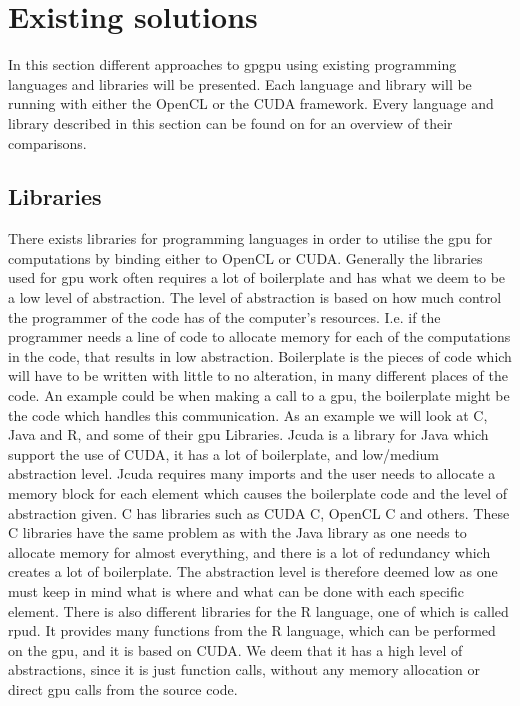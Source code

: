 \section{Existing solutions} %
\label{sec:state_of_the_art}
In this section different approaches to \acrshort{gpgpu} using existing programming languages and libraries will be presented.
Each language and library will be running with either the OpenCL or the CUDA framework.
Every language and library described in this section can be found on  for an overview of their comparisons.
      
\subsection{Libraries} 
There exists libraries for programming languages in order to utilise the \acrshort{gpu} for computations by binding either to OpenCL or CUDA.
Generally the libraries used for \acrshort{gpu} work often requires a lot of boilerplate and has what we deem to be a low level of abstraction.
The level of abstraction is based on how much control the programmer of the code has of the computer's resources.
I.e. if the programmer needs a line of code to allocate memory for each of the computations in the code, that results in low abstraction.
Boilerplate is the pieces of code which will have to be written with little to no alteration, in many different places of the code.
An example could be when making a call to a \acrshort{gpu}, the boilerplate might be the code which handles this communication.
As an example we will look at C, Java and R, and some of their \acrshort{gpu} Libraries.
Jcuda is a library for Java which support the use of CUDA, it has a lot of boilerplate, and low/medium abstraction level. \citep{Java_library}
Jcuda requires many imports and the user needs to allocate a memory block for each element which causes the boilerplate code and the level of abstraction given. \citep{Java_malloc}
C has libraries such as CUDA C, OpenCL C and others.
These C libraries have the same problem as with the Java library as one needs to allocate memory for almost everything, and there is a lot of redundancy which creates a lot of boilerplate.
The abstraction level is therefore deemed low as one must keep in mind what is where and what can be done with each specific element. \citep{C_CUDA} 
There is also different libraries for the R language, one of which is called rpud.
It provides many functions from the R language, which can be performed on the \acrshort{gpu}, and it is based on CUDA.
We deem that it has a high level of abstractions, since it is just function calls, without any memory allocation or direct \acrshort{gpu} calls from the source code. \citep{Rcuda} 

